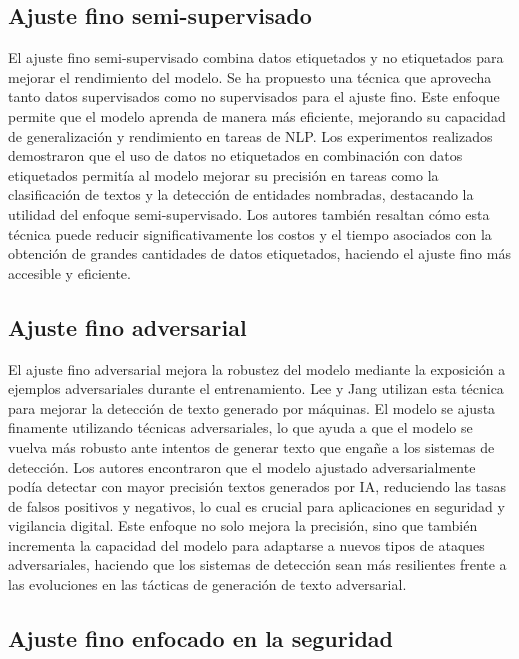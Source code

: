 \subsection{Ajuste fino semi-supervisado}

El ajuste fino semi-supervisado combina datos etiquetados y no etiquetados para mejorar el rendimiento del modelo. Se ha propuesto una técnica \cite{Su2021} que aprovecha tanto datos supervisados como no supervisados para el ajuste fino. Este enfoque permite que el modelo aprenda de manera más eficiente, mejorando su capacidad de generalización y rendimiento en tareas de NLP. Los experimentos realizados demostraron que el uso de datos no etiquetados en combinación con datos etiquetados permitía al modelo mejorar su precisión en tareas como la clasificación de textos y la detección de entidades nombradas, destacando la utilidad del enfoque semi-supervisado. Los autores también resaltan cómo esta técnica puede reducir significativamente los costos y el tiempo asociados con la obtención de grandes cantidades de datos etiquetados, haciendo el ajuste fino más accesible y eficiente.

\subsection{Ajuste fino adversarial}

El ajuste fino adversarial mejora la robustez del modelo mediante la exposición a ejemplos adversariales durante el entrenamiento. Lee y Jang \cite{Lee2024} utilizan esta técnica para mejorar la detección de texto generado por máquinas. El modelo se ajusta finamente utilizando técnicas adversariales, lo que ayuda a que el modelo se vuelva más robusto ante intentos de generar texto que engañe a los sistemas de detección. Los autores encontraron que el modelo ajustado adversarialmente podía detectar con mayor precisión textos generados por IA, reduciendo las tasas de falsos positivos y negativos, lo cual es crucial para aplicaciones en seguridad y vigilancia digital. Este enfoque no solo mejora la precisión, sino que también incrementa la capacidad del modelo para adaptarse a nuevos tipos de ataques adversariales, haciendo que los sistemas de detección sean más resilientes frente a las evoluciones en las tácticas de generación de texto adversarial.

\subsection{Ajuste fino enfocado en la seguridad}

